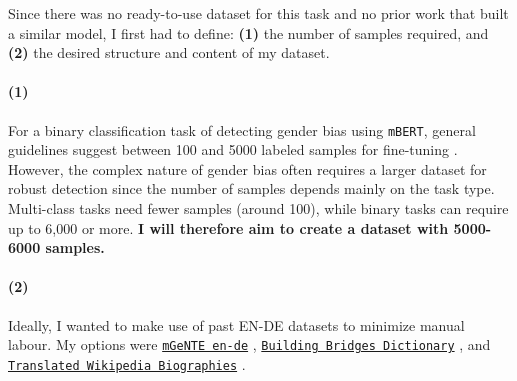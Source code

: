 Since there was no ready-to-use dataset for this task and no prior work that built a similar model, I first had to define: \textbf{(1)} the number of samples required,  and \textbf{(2)} the desired structure and content of my dataset.

\paragraph{(1)} For a binary classification task of detecting gender bias using \texttt{mBERT}, general guidelines suggest between 100 and 5000 labeled samples for fine-tuning \citep{pecherComparingSpecialisedSmall2024}. However, the complex nature of gender bias often requires a larger dataset for robust detection since the number of samples depends mainly on the task type. Multi-class tasks need fewer samples (around 100), while binary tasks can require up to 6,000 or more. \textbf{I will therefore aim to create a dataset with 5000-6000 samples.}

\paragraph{(2)} Ideally, I wanted to make use of past EN-DE datasets to minimize manual labour. My options were \texttt{\href{https://huggingface.co/datasets/FBK-MT/mGeNTE}{mGeNTE en-de}} \citep{savoldiMGeNTEMultilingualResource2025}, \texttt{\href{https://github.com/g8a9/building-bridges-gender-fair-german-mt}{Building Bridges Dictionary}} \citep{lardelliBuildingBridgesDataset2024}, and \texttt{\href{https://research.google/blog/a-dataset-for-studying-gender-bias-in-translation/}{Translated Wikipedia Biographies}} \citep{stellaDatasetStudyingGender2021}.

